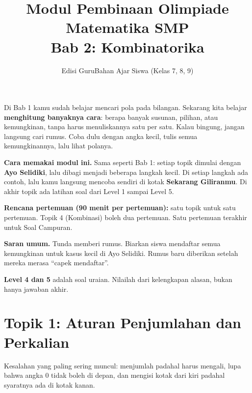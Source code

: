 \documentclass[11pt,a4paper]{article}
\title{\textbf{Modul Pembinaan Olimpiade Matematika SMP\\Bab 2: Kombinatorika}}
\author{\ifguru Edisi Guru\else Bahan Ajar Siswa (Kelas 7, 8, 9)\fi}
\date{}
\begin{document}
\maketitle
\thispagestyle{empty}

\begin{tcolorbox}[title={Halo lagi, Calon Sang Juara!}]
Di Bab 1 kamu sudah belajar mencari pola pada bilangan. Sekarang kita belajar
\textbf{menghitung banyaknya cara}: berapa banyak susunan, pilihan, atau kemungkinan, tanpa
harus menuliskannya satu per satu. Kalau bingung, jangan langsung cari rumus. Coba dulu dengan
angka kecil, tulis semua kemungkinannya, lalu lihat polanya.
\end{tcolorbox}

\textbf{Cara memakai modul ini.} Sama seperti Bab 1: setiap topik dimulai dengan
\textbf{Ayo Selidiki}, lalu dibagi menjadi beberapa langkah kecil. Di setiap langkah ada
contoh, lalu kamu langsung mencoba sendiri di kotak \textbf{Sekarang Giliranmu}. Di akhir topik
ada latihan soal dari Level 1 sampai Level 5.

\ifguru
\begin{catatanguru}
\textbf{Rencana pertemuan (90 menit per pertemuan):} satu topik untuk satu pertemuan. Topik 4
(Kombinasi) boleh dua pertemuan. Satu pertemuan terakhir untuk Soal Campuran.

\textbf{Saran umum.} Tunda memberi rumus. Biarkan siswa mendaftar semua kemungkinan untuk kasus
kecil di Ayo Selidiki. Rumus baru diberikan setelah mereka merasa ``capek mendaftar''.

\textbf{Level 4 dan 5} adalah soal uraian. Nilailah dari kelengkapan alasan, bukan hanya
jawaban akhir.
\end{catatanguru}
\fi

\newpage
\section*{Topik 1: Aturan Penjumlahan dan Perkalian}

\begin{catatanguru}
Kesalahan yang paling sering muncul: menjumlah padahal harus mengali, lupa bahwa angka 0 tidak
boleh di depan, dan mengisi kotak dari kiri padahal syaratnya ada di kotak kanan.
\end{catatanguru}
\end{document}
